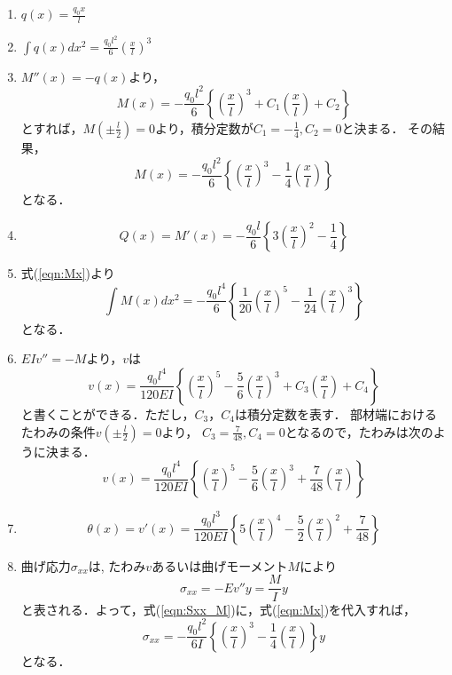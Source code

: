 \documentclass[10pt,a4j]{jarticle}
\begin{document}
\begin{enumerate}
\item
	$q(x)=\frac{q_0x}{l}$
\item
	$\int q(x)dx^2 =\frac{q_0l^2}{6}\left(\frac{x}{l}\right)^3$
\item
	$M''(x)=-q(x)$より，
	\begin{equation}
		M(x)= 
		-\frac{q_0l^2}{6}
		\left\{	
		\left(\frac{x}{l}\right)^3
		+
		C_1
		\left(\frac{x}{l}\right)
		+
		C_2
		\right\}
	\end{equation}
	とすれば，$M\left(\pm\frac{l}{2}\right)=0$より，積分定数が$C_1=-\frac{1}{4},C_2=0$と決まる．
	その結果，
	\begin{equation}
		M(x)= 
		-\frac{q_0l^2}{6}
		\left\{	
		\left(\frac{x}{l}\right)^3
		-
		\frac{1}{4}	
		\left(\frac{x}{l}\right)
		\right\}
		\label{eqn:Mx}
	\end{equation}
	となる．
\item
	\begin{equation}
		Q(x)=M'(x)=-\frac{q_0l}{6} \left\{ 
		3\left(\frac{x}{l}\right)^2
		-
		\frac{1}{4}	
		\right\} 
	\end{equation}
\item
	式(\ref{eqn:Mx})より
	\begin{equation}
		\int M(x)dx^2
		=
		-\frac{q_0l^4}{6}
		\left\{	
		\frac{1}{20}
		\left(\frac{x}{l}\right)^5
		-
		\frac{1}{24}	
		\left(\frac{x}{l}\right)^3
		\right\}
		\label{eqn:vx0}
	\end{equation}
	となる．
\item
	$EIv''=-M$より，$v$は
	\begin{equation}
		v(x)=\frac{q_0l^4}{120EI}
		\left\{
			\left(\frac{x}{l}\right)^5
			-
			\frac{5}{6}
			\left(\frac{x}{l}\right)^3
			+
			C_3
			\left(\frac{x}{l}\right)
			+
			C_4
		\right\}
	\end{equation}
	と書くことができる．ただし，$C_3，C_4$は積分定数を表す．
	部材端におけるたわみの条件$v\left(\pm \frac{l}{2}\right)=0$より，
	$C_3=\frac{7}{48},C_4=0$となるので，たわみは次のように決まる．
	\begin{equation}
		v(x)=\frac{q_0l^4}{120EI}
		\left\{
			\left(\frac{x}{l}\right)^5
			-
			\frac{5}{6}
			\left(\frac{x}{l}\right)^3
			+
			\frac{7}{48}
			\left(\frac{x}{l}\right)
		\right\}
	\end{equation}
\item
	\begin{equation}
		\theta(x)=v'(x)=\frac{q_0l^3}{120EI}
		\left\{
			5
			\left(\frac{x}{l}\right)^4
			-
			\frac{5}{2}
			\left(\frac{x}{l}\right)^2
			+
			\frac{7}{48}
		\right\}
	\end{equation}
\item
曲げ応力$\sigma_{xx}$は, たわみ$v$あるいは曲げモーメント$M$により
\begin{equation}
	\sigma_{xx}=-Ev''y= \frac{M}{I}y 
	\label{eqn:Sxx_M}
\end{equation}
と表される．よって，式(\ref{eqn:Sxx_M})に，式(\ref{eqn:Mx})を代入すれば，
\begin{equation}
	\sigma_{xx}=
	-\frac{q_0l^2}{6I}
	\left\{	
	\left(\frac{x}{l}\right)^3
	-
	\frac{1}{4}	
	\left(\frac{x}{l}\right)
	\right\}y
\end{equation}
	となる．
\end{enumerate}
\end{document}
